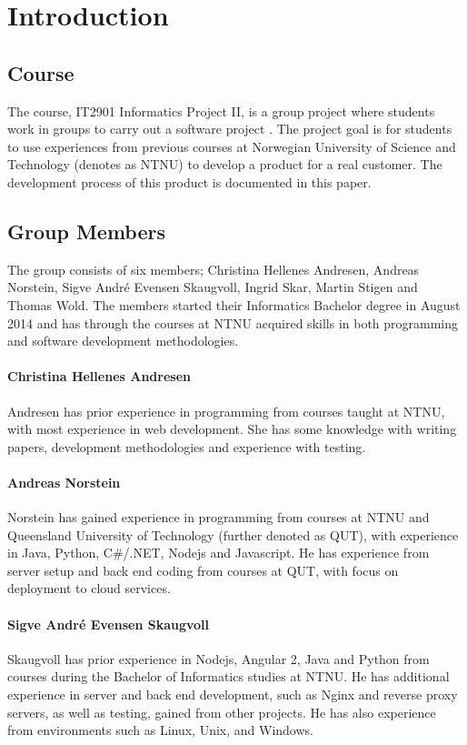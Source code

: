 
\chapter{Introduction}

\section{Course}
The course, IT2901 Informatics Project II, is a group project where students work in groups to carry out a software project \cite{EmneKode}. The project goal is for students to use experiences from previous courses at Norwegian University of Science and Technology (denotes as NTNU) to develop a product for a real customer. The development process of this product is documented in this paper.


\section{Group Members}
The group consists of six members; Christina Hellenes Andresen, Andreas Norstein, Sigve André Evensen Skaugvoll, Ingrid Skar, Martin Stigen and Thomas Wold. The members started their Informatics Bachelor degree in August 2014 and has through the courses at NTNU acquired skills in both programming and software development methodologies.

\subsubsection{Christina Hellenes Andresen}
\label{christina}
Andresen has prior experience in programming from courses taught at NTNU, with most experience in web development. She has some knowledge with writing papers, development methodologies and experience with testing.

\subsubsection{Andreas Norstein}
Norstein has gained experience in programming from courses at NTNU and Queensland University of Technology (further denoted as QUT), with experience in Java, Python, C\#/.NET, Nodejs and Javascript. He has experience from server setup and back end coding from courses at QUT, with focus on deployment to cloud services. 

\subsubsection{Sigve André Evensen Skaugvoll}
\label{sigve}
Skaugvoll has prior experience in Nodejs, Angular 2, Java and Python from courses during the Bachelor of Informatics studies at NTNU. He has additional experience in server and back end development, such as Nginx and reverse proxy servers, as well as testing, gained from other projects. He has also experience from environments such as Linux, Unix, and Windows.

